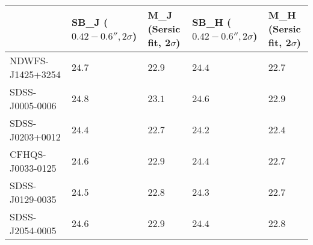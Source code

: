 \begin{tabular}{lllll}
\toprule
{} & SB_J ($0.42-0.6'', 2\sigma$) & M_J (Sersic fit, 2$\sigma$) & SB_H ($0.42-0.6'', 2\sigma$) & M_H (Sersic fit, 2$\sigma$) \\
\midrule
NDWFS-J1425+3254 &                       $24.7$ &                      $22.9$ &                       $24.4$ &                      $22.7$ \\
SDSS-J0005-0006  &                       $24.8$ &                      $23.1$ &                       $24.6$ &                      $22.9$ \\
SDSS-J0203+0012  &                       $24.4$ &                      $22.7$ &                       $24.2$ &                      $22.4$ \\
CFHQS-J0033-0125 &                       $24.6$ &                      $22.9$ &                       $24.4$ &                      $22.7$ \\
SDSS-J0129-0035  &                       $24.5$ &                      $22.8$ &                       $24.3$ &                      $22.7$ \\
SDSS-J2054-0005  &                       $24.6$ &                      $22.9$ &                       $24.4$ &                      $22.8$ \\
\bottomrule
\end{tabular}
